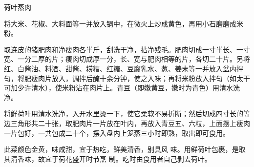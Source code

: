 \begin{recipe}{荷叶蒸肉}

\ingredients


\cooking

\step 将大米、花椒、大料面等一并放入锅中，在微火上炒成黄色，再用小石磨磨成米粉。

\step 取连皮的猪肥肉和净瘦肉各半斤，刮洗干净，拈净残毛。肥肉切成一寸半长、一寸宽、一分二厚的片；痩肉切成厚一分，长、宽与肥肉相等的片，各切二十片。另将红、白酱油、料酒、甜酱、耢糟、红糖、豆腐乳水、葱、姜末等一并放入盆内拌匀，将肥瘦肉片放入，调拌后醃十余分钟，使之入味；再将米粉放入拌匀（如太干可加少许清水），使米粉沾在肉片上。青豆（即嫩黄豆，嫩时为青色）用清水洗净。

\step 将鲜荷叶用清水洗净，入开水里烫一下，使它柔软不易折断；然后切成四寸长的等边三角形共二十张，取肥肉片一片放在叶内，再放入青豆五、六粒，上面摆上瘦肉一片包好，一共包成二十个，摆入盘内上笼蒸三小时即熟，取出即可食用。

\notes

此菜颜色金黄，味咸甜，宜于热吃，鲜美清香，别具风 味。用鲜荷叶包裹，是取其清香味，故宜于荷花盛开时节烹 制。吃时由食用者自己剥去荷叶。

\end{recipe}

